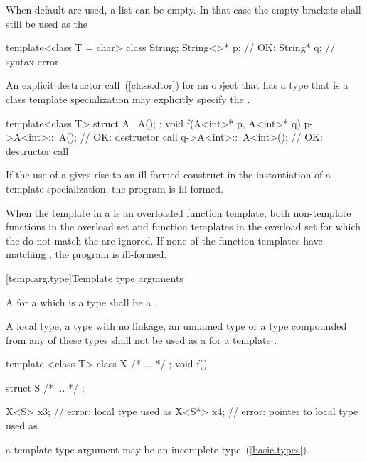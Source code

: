 \pnum
When default
are used, a
list can be empty.
In that case the empty
\tcode{<>}
brackets shall still be used as the
\enterexample

\begin{codeblock}
template<class T = char> class String;
String<>* p;                    // OK: 
String* q;                      // syntax error
\end{codeblock}
\exitexampleb

\pnum
An explicit destructor call~(\ref{class.dtor}) for an object that has a type
that is a class template specialization may explicitly specify the
.
\enterexample

\begin{codeblock}
template<class T> struct A {
	~A();
};
void f(A<int>* p, A<int>* q) {
	p->A<int>::~A();        // OK: destructor call
	q->A<int>::~A<int>();   // OK: destructor call
}
\end{codeblock}
\exitexampleb

\pnum
If the use of a
gives rise to an ill-formed construct in the instantiation of a
template specialization, the program is ill-formed.

\pnum
When the template in a
is an overloaded function template, both non-template functions in the overload
set and function templates in the overload set for
which the
do not match the
are ignored.
If none of the function templates have matching
,
the program is ill-formed.

[temp.arg.type]{Template type arguments}

\pnum
A
for a
which is a type
shall be a
.

\pnum
A local type, a type with no linkage, an unnamed type or a type compounded
from any of these types shall not be used as a 
for a template .
\enterexample
\begin{codeblock}
template <class T> class X { /* ... */ };
void f()
{
    struct S { /* ... */ };

    X<S> x3;			// error: local type used as 
    X<S*> x4;			// error: pointer to local type used as 
}
\end{codeblock}
\exitexampleb
\enternote
a template type argument may be an incomplete type~(\ref{basic.types}).
\exitnote

